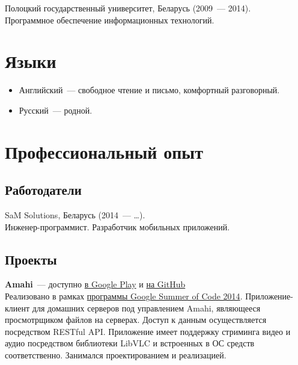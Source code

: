     Полоцкий государственный университет, Беларусь (2009~--- 2014). \\
    Программное обеспечение информационных технологий.


  \section*{Языки}

    \begin{itemize}

      \item Английский~--- свободное чтение и письмо, комфортный разговорный.

      \item Русский~--- родной.

    \end{itemize}


  \section*{Профессиональный опыт}

    \subsection*{Работодатели}

      SaM Solutions, Беларусь (2014~--- \dots). \\
      Инженер-программист. Разработчик мобильных приложений.

    \subsection*{Проекты}

      \textbf{Amahi}~--- доступно \href{https://play.google.com/store/apps/details?id=org.amahi.anywhere}{в Google Play}
        и \href{https://github.com/amahi/android}{на GitHub} \\

        Реализовано в рамках \href{https://developers.google.com/open-source/soc}{программы Google Summer of Code 2014}.
        Приложение-клиент для домашних серверов под управлением Amahi, являющееся
        просмотрщиком файлов на серверах. Доступ к данным осуществляется
        посредством RESTful API. Приложение имеет поддержку стриминга
        видео и аудио посредством библиотеки LibVLC и встроенных в ОС
        средств соответственно. Занимался проектированием и реализацией. \\

